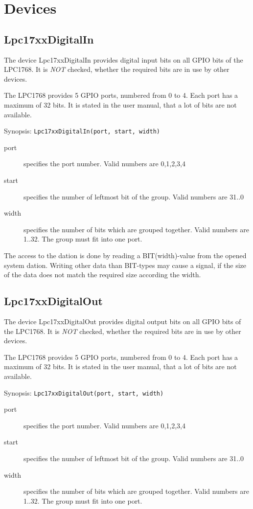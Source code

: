 \section{Devices}

\subsection{Lpc17xxDigitalIn}
The device Lpc17xxDigitalIn provides digital input bits on all
GPIO bits of the LPC1768. It is {\em NOT} checked, whether the 
required bits are in use by other devices.

The LPC1768 provides 5 GPIO ports, numbered from 0 to 4.
Each port has a maximum of 32 bits.
It is stated in the user manual, that a lot of bits are not
available.

Synopsis: \verb|Lpc17xxDigitalIn(port, start, width)|

\begin{description}
\item [port] specifies the port number. Valid numbers are 0,1,2,3,4
\item[start] specifies the number of leftmost bit of the group. Valid numbers
     are 31..0
\item [width] specifies the number of bits which are grouped together.
     Valid numbers are 1..32.
     The group must fit into one port.
\end{description}

The access to the dation is done by reading a BIT(width)-value from the
opened system dation.
Writing other data than BIT-types  may cause a signal, if the size of the
data does not match the required size according the width.

\subsection{Lpc17xxDigitalOut}
The device Lpc17xxDigitalOut provides digital output bits on all
GPIO bits of the LPC1768. It is {\em NOT} checked, whether the 
required bits are in use by other devices.

The LPC1768 provides 5 GPIO ports, numbered from 0 to 4.
Each port has a maximum of 32 bits.
It is stated in the user manual, that a lot of bits are not
available.

Synopsis: \verb|Lpc17xxDigitalOut(port, start, width)|

\begin{description}
\item [port] specifies the port number. Valid numbers are 0,1,2,3,4
\item[start] specifies the number of leftmost bit of the group. Valid numbers
     are 31..0
\item [width] specifies the number of bits which are grouped together.
     Valid numbers are 1..32.
     The group must fit into one port.
\end{description}

